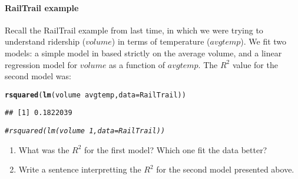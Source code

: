 \documentclass[10pt]{article}\usepackage[]{graphicx}\usepackage[]{color}
\makeatletter
\newcommand{\hlcom}[1]{\textcolor[rgb]{0.678,0.584,0.686}{\textit{#1}}}%
\newcommand{\hlopt}[1]{\textcolor[rgb]{0,0,0}{#1}}%
\newcommand{\hlstd}[1]{\textcolor[rgb]{0.345,0.345,0.345}{#1}}%
\newcommand{\hlkwc}[1]{\textcolor[rgb]{0.333,0.667,0.333}{#1}}%
\newcommand{\hlkwd}[1]{\textcolor[rgb]{0.737,0.353,0.396}{\textbf{#1}}}%
\newenvironment{kframe}{%
 \def\at@end@of@kframe{}%
 \ifinner\ifhmode%
  \def\at@end@of@kframe{\end{minipage}}%
  \begin{minipage}{\columnwidth}%
 \fi\fi%
 \def\FrameCommand##1{\hskip\@totalleftmargin \hskip-\fboxsep
 \colorbox{shadecolor}{##1}\hskip-\fboxsep
     \hskip-\linewidth \hskip-\@totalleftmargin \hskip\columnwidth}%
 \MakeFramed {\advance\hsize-\width
   \@totalleftmargin\z@ \linewidth\hsize
   \@setminipage}}%
 {\par\unskip\endMakeFramed%
 \at@end@of@kframe}
\newenvironment{knitrout}{}{} %
\makeatother
\begin{document}
\paragraph{RailTrail example}

Recall the RailTrail example from last time, in which we were trying to understand ridership ($volume$) in terms of temperature ($avgtemp$). We fit two models: a simple model in based strictly on the average volume, and a linear regression model for $volume$ as a function of $avgtemp$. The $R^2$ value for the second model was:

\begin{knitrout}\footnotesize
{}\color{fgcolor}\begin{kframe}
\begin{alltt}
\hlkwd{rsquared}\hlstd{(}\hlkwd{lm}\hlstd{(volume} \hlopt{~} \hlstd{avgtemp,} \hlkwc{data} \hlstd{= RailTrail))}
\end{alltt}
\begin{verbatim}
## [1] 0.1822039
\end{verbatim}
\begin{alltt}
\hlcom{# rsquared(lm(volume ~ 1, data=RailTrail))}
\end{alltt}
\end{kframe}
\end{knitrout}

\begin{enumerate}
  \itemsep0.5in
  \item What was the $R^2$ for the first model? Which one fit the data better? 
  \item Write a sentence interpretting the $R^2$ for the second model presented above.
  \vspace{0.5in}
\end{enumerate}


% 
% 
% 
% 
% 
% 
% 
% 
% 
\end{document}
